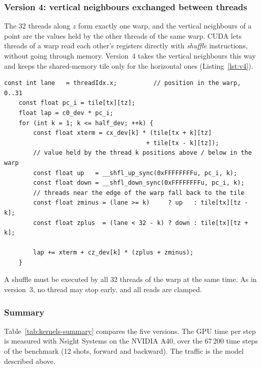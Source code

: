 \documentclass[letterpaper,11pt,leqno]{article}
\begin{document}
\subsubsection{Version 4: vertical neighbours exchanged between threads}

The 32 threads along $z$ form exactly one warp, and the vertical neighbours
of a point are the values held by the other threads of the same warp. CUDA
lets threads of a warp read each other's registers directly with
\emph{shuffle} instructions, without going through memory. Version~4 takes
the vertical neighbours this way and keeps the shared-memory tile only for
the horizontal ones (Listing~\ref{lst:v4}).

\noindent\begin{minipage}{\linewidth}
\begin{lstlisting}[style=cuda, caption={Version 4: vertical neighbours obtained by warp shuffles.}, label={lst:v4}]
    const int lane   = threadIdx.x;          // position in the warp, 0..31
    const float pc_i = tile[tx][tz];
    float lap = c0_dev * pc_i;
    for (int k = 1; k <= half_dev; ++k) {
        const float xterm = cx_dev[k] * (tile[tx + k][tz]
                                       + tile[tx - k][tz]);
        // value held by the thread k positions above / below in the warp
        const float up   = __shfl_up_sync(0xFFFFFFFFu, pc_i, k);
        const float down = __shfl_down_sync(0xFFFFFFFFu, pc_i, k);
        // threads near the edge of the warp fall back to the tile
        const float zminus = (lane >= k)     ? up   : tile[tx][tz - k];
        const float zplus  = (lane < 32 - k) ? down : tile[tx][tz + k];

        lap += xterm + cz_dev[k] * (zplus + zminus);
    }
\end{lstlisting}
\end{minipage}

A shuffle must be executed by all 32 threads of the warp at the same time.
As in version~3, no thread may stop early, and all reads are clamped.

\subsubsection{Summary}

Table~\ref{tab:kernels-summary} compares the five versions. The GPU time per
step is measured with Nsight Systems on the NVIDIA A40, over the 67\,200 time
steps of the benchmark (12 shots, forward and backward). The traffic is the
model described above.
\end{document}
